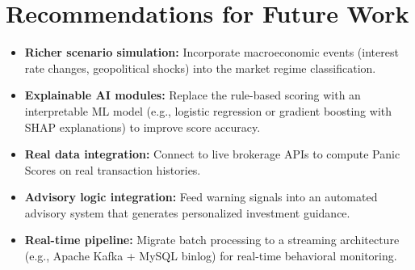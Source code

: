 \section{Recommendations for Future Work}

\begin{itemize}
    \item \textbf{Richer scenario simulation:} Incorporate macroeconomic events (interest rate changes, geopolitical shocks) into the market regime classification.
    \item \textbf{Explainable AI modules:} Replace the rule-based scoring with an interpretable ML model (e.g., logistic regression or gradient boosting with SHAP explanations) to improve score accuracy.
    \item \textbf{Real data integration:} Connect to live brokerage APIs to compute Panic Scores on real transaction histories.
    \item \textbf{Advisory logic integration:} Feed warning signals into an automated advisory system that generates personalized investment guidance.
    \item \textbf{Real-time pipeline:} Migrate batch processing to a streaming architecture (e.g., Apache Kafka + MySQL binlog) for real-time behavioral monitoring.
\end{itemize}
